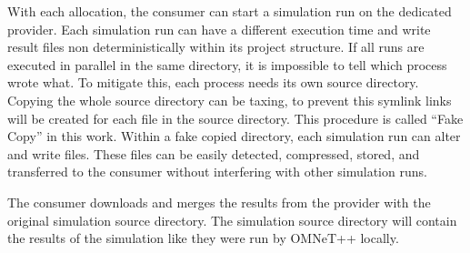 With each allocation, the consumer can start a simulation run on the dedicated provider. Each simulation run can have a different execution time and write result files non deterministically within its project structure. If all runs are executed in parallel in the same directory, it is impossible to tell which process wrote what. To mitigate this, each process needs its own source directory. Copying the whole source directory can be taxing, to prevent this symlink links will be created for each file in the source directory. This procedure is called “Fake Copy” in this work. Within a fake copied directory, each simulation run can alter and write files. These files can be easily detected, compressed, stored, and transferred to the consumer without interfering with other simulation runs.

The consumer downloads and merges the results from the provider with the original simulation source directory. The simulation source directory will contain the results of the simulation like they were run by OMNeT++ locally.
